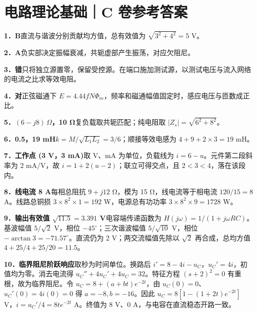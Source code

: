 \documentclass[UTF8,zihao=-4]{ctexart}
\newcommand{\ans}[2]{\par\medskip\noindent\textbf{#1}\quad #2\par}
\begin{document}
\section*{电路理论基础｜C 卷参考答案}
\ans{1．B}{直流与谐波分别贡献均方值，总有效值为 $\sqrt{3^2+4^2}=5$ V。}
\ans{2．A}{负实部决定振幅衰减，共轭虚部产生振荡，对应欠阻尼。}
\ans{3．错}{只将独立源置零，保留受控源。在端口施加测试源，以测试电压与流入网络的电流之比求等效电阻。}
\ans{4．对}{正弦磁通下 $E=4.44 fN\Phi_m$，频率和磁通幅值固定时，感应电压与匝数成正比。}
\ans{5．$(6-j8)\,\Omega$，10 Ω}{复负载取共轭匹配；纯电阻取 $|Z_s|=\sqrt{6^2+8^2}$。}
\ans{6．0.5，19 mH}{$k=M/\sqrt{L_1L_2}=3/6$；顺接等效电感为 $4+9+2\times3=19$ mH。}
\ans{7．工作点 (3 V，3 mA)}{取 V、mA 为单位，负载线为 $i=6-u$。元件第二段斜率为 2 mA/V，故 $i=1+2(u-2)$；联立可得交点，且 $2<3<4$，落在该段内。}
\ans{8．线电流 8 A}{每相总阻抗 $9+j12$ Ω，模为 15 Ω，线电流等于相电流 $120/15=8$ A。线路总铜损 $3\times8^2\times1=192$ W，电源总有功功率 $3\times8^2\times9=1728$ W。}
\ans{9．输出有效值 $\sqrt{11.5}=3.391$ V}{电容端传递函数为 $H(j\omega)=1/(1+j\omega RC)$。基波幅值 $5/\sqrt2$ V，相位 $-45^\circ$；三次谐波幅值 $5/\sqrt{10}$ V，相位 $-\arctan3=-71.57^\circ$。直流仍为 2 V；两交流幅值先除以 $\sqrt2$ 再合成，总均方值 $4+25/4+25/20=11.5$。}
\ans{10．临界阻尼阶跃响应}{取秒为时间单位。换路后 $i'=8-4i-u_C$，$u_C'=4i$，初值均为零。消去电流得 $u_C''+4u_C'+4u_C=32$。特征方程 $(s+2)^2=0$ 有重根，故为临界阻尼。令 $u_C=8+(a+bt)e^{-2t}$，由 $u_C(0)=0$、$u_C'(0)=4i(0)=0$ 得 $a=-8,b=-16$。因此 $u_C=8[1-(1+2t)e^{-2t}]$ V，$i=u_C'/4=8te^{-2t}$ A。终值为 8 V、0 A，与电容在直流稳态开路一致。}
\end{document}
